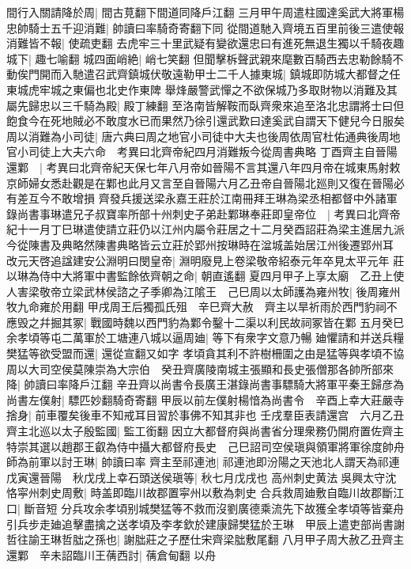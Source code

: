 間行入關請降於周|{
	間古莧翻下間道同降戶江翻}
三月甲午周遣柱國達奚武大將軍楊忠帥騎士五千迎消難|{
	帥讀曰率騎奇寄翻下同}
從間道馳入齊境五百里前後三遣使報消難皆不報|{
	使疏吏翻}
去虎牢三十里武疑有變欲還忠曰有進死無退生獨以千騎夜趣城下|{
	趣七喻翻}
城四面峭絶|{
	峭七笑翻}
但聞擊柝聲武親來麾數百騎西去忠勒餘騎不動俟門開而入馳遣召武齊鎮城伏敬遠勒甲士二千人據東城|{
	鎮城即防城大都督之任東城虎牢城之東偏也北史作東陴}
舉烽嚴警武憚之不欲保城乃多取財物以消難及其屬先歸忠以三千騎為殿|{
	殿丁練翻}
至洛南皆解鞍而臥齊衆來追至洛北忠謂將士曰但飽食今在死地賊必不敢度水已而果然乃徐引還武歎曰達奚武自謂天下健兒今日服矣周以消難為小司徒|{
	唐六典曰周之地官小司徒中大夫也後周依周官杜佑通典後周地官小司徒上大夫六命　考異曰北齊帝紀四月消難叛今從周書典略}
丁酉齊主自晉陽還鄴　|{
	考異曰北齊帝紀天保七年八月帝如晉陽不言其還八年四月帝在城東馬射敕京師婦女悉赴觀是在鄴也此月又言至自晉陽六月乙丑帝自晉陽北廵則又復在晉陽必有差互今不敢增損}
齊發兵援送梁永嘉王莊於江南冊拜王琳為梁丞相都督中外諸軍錄尚書事琳遣兄子叔寶率所部十州刺史子弟赴鄴琳奉莊即皇帝位　|{
	考異曰北齊帝紀十一月丁巳琳遣使請立莊仍以江州内屬令莊居之十二月癸酉詔莊為梁主進居九派今從陳書及典略然陳書典略皆云立莊於郢州按琳時在湓城盖始居江州後遷郢州耳}
改元天啓追諡建安公淵明曰閔皇帝|{
	淵明廢見上卷梁敬帝紹泰元年卒見太平元年}
莊以琳為侍中大將軍中書監餘依齊朝之命|{
	朝直遙翻}
夏四月甲子上享太廟　乙丑上使人害梁敬帝立梁武林侯諮之子季卿為江隂王　己巳周以太師護為雍州牧|{
	後周雍州牧九命雍於用翻}
甲戌周王后獨孤氏殂　辛巳齊大赦　齊主以旱祈雨於西門豹祠不應毁之幷掘其冢|{
	戰國時魏以西門豹為鄴令鑿十二渠以利民故祠冢皆在鄴}
五月癸巳余孝頃等屯二萬軍於工塘連八城以逼周廸|{
	等下有衆字文意乃暢}
廸懼請和并送兵糧樊猛等欲受盟而還|{
	還從宣翻又如字}
孝頃貪其利不許樹柵圍之由是猛等與孝頃不協　周以大司空侯莫陳崇為大宗伯　癸丑齊廣陵南城主張顯和長史張僧那各帥所部來降|{
	帥讀曰率降戶江翻}
辛丑齊以尚書令長廣王湛錄尚書事驃騎大將軍平秦王歸彦為尚書左僕射|{
	驃匹妙翻騎奇寄翻}
甲辰以前左僕射楊愔為尚書令　辛酉上幸大莊嚴寺捨身|{
	前車覆矣後車不知戒耳目習於事佛不知其非也}
壬戌羣臣表請還宫　六月乙丑齊主北巡以太子殷監國|{
	監工銜翻}
因立大都督府與尚書省分理衆務仍開府置佐齊主特崇其選以趙郡王叡為侍中攝大都督府長史　己巳詔司空侯瑱與領軍將軍徐度帥舟師為前軍以討王琳|{
	帥讀曰率}
齊主至祁連池|{
	祁連池即汾陽之天池北人謂天為祁連}
戊寅還晉陽　秋戊戌上幸石頭送侯瑱等|{
	秋七月戊戌也}
高州刺史黄法吳興太守沈恪寜州刺史周敷|{
	時盖即臨川故郡置寜州以敷為刺史}
合兵救周廸敷自臨川故郡斷江口|{
	斷音短}
分兵攻余孝頃别城樊猛等不救而沒劉廣德乘流先下故獲全孝頃等皆棄舟引兵步走廸追擊盡擒之送孝頃及李孝欽於建康歸樊猛於王琳　甲辰上遣吏部尚書謝哲往諭王琳哲朏之孫也|{
	謝朏莊之子歷仕宋齊梁朏敷尾翻}
八月甲子周大赦乙丑齊主還鄴　辛未詔臨川王蒨西討|{
	蒨倉甸翻}
以舟

